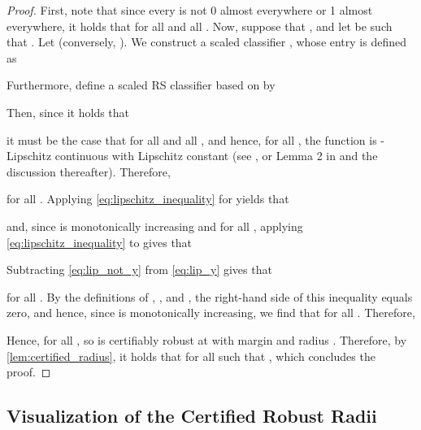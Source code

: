 \documentclass[11pt, letterpaper]{article}
\theoremstyle{plain}
\theoremstyle{definition}
\begin{document}
\begin{proof}
	First, note that since every  is not 0 almost everywhere or 1 almost everywhere, it holds that  for all  and all . Now, suppose that , and let  be such that . Let  (conversely, ). We construct a scaled classifier , whose  entry is defined as
	
	Furthermore, define a scaled RS classifier  based on  by 
	
	Then, since it holds that
	
	it must be the case that  for all  and all , and hence, for all , the function  is -Lipschitz continuous with Lipschitz constant  (see \cite[Lemma~1]{Levine19}, or Lemma 2 in \cite{Salman19} and the discussion thereafter). Therefore,
	
	for all . Applying \cref{eq:lipschitz_inequality} for  yields that
	
	and, since  is monotonically increasing and  for all , applying \cref{eq:lipschitz_inequality} to  gives that
	
	Subtracting \cref{eq:lip_not_y} from \cref{eq:lip_y} gives that
	
	for all . By the definitions of , , and , the right-hand side of this inequality equals zero, and hence, since  is monotonically increasing, we find that  for all . Therefore,
	
	Hence,  for all , so  is certifiably robust at  with margin  and radius . Therefore, by \cref{lem:certified_radius}, it holds that  for all  such that , which concludes the proof.
\end{proof}


\subsection{Visualization of the Certified Robust Radii} \label{sec:certified_exp}
\end{document}
